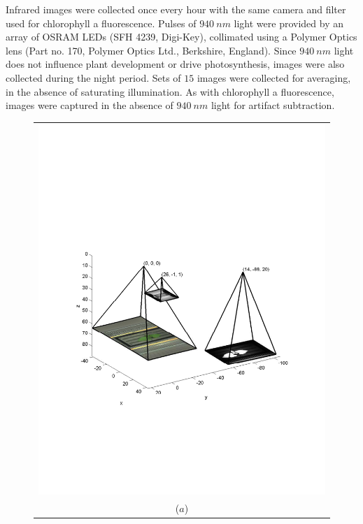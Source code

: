 Infrared images were collected once every hour with the same camera and filter used for chlorophyll a fluorescence.  
Pulses of $940~nm$ light were provided by an array of OSRAM LEDs (SFH 4239, Digi-Key), collimated using a Polymer Optics lens (Part no. 170, Polymer Optics Ltd., Berkshire, England).  
Since $940~nm$ light does not influence plant development or drive photosynthesis, images were also collected during the night period.  
Sets of $15$ images were collected for averaging, in the absence of saturating illumination.   
As with chlorophyll a fluorescence, images were captured in the absence of $940~nm$ light for artifact subtraction.

\begin{figure}
\begin{tabular}{c}
  \includegraphics[width=\linewidth,trim=50 200 45 250,clip]{Figures/CameraConfiguration} \\
  ($a$)\\

\end{tabular}
\end{figure}
